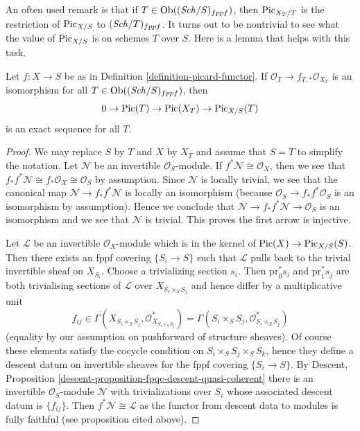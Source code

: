 \noindent
An often used remark is that if $T \in \mathop{\mathrm{Ob}}\nolimits((\mathit{Sch}/S)_{fppf})$, then
$\mathrm{Pic}_{X_T/T}$ is the restriction of $\mathrm{Pic}_{X/S}$ to
$(\mathit{Sch}/T)_{fppf}$.
It turns out to be nontrivial to see what the value of $\mathrm{Pic}_{X/S}$
is on schemes $T$ over $S$. Here is a lemma that helps with this
task.

\begin{lemma}
\label{lemma-flat-geometrically-connected-fibres}
Let $f : X \to S$ be as in Definition \ref{definition-picard-functor}.
If $\mathcal{O}_T \to f_{T, *}\mathcal{O}_{X_T}$ is an isomorphism
for all $T \in \mathop{\mathrm{Ob}}\nolimits((\mathit{Sch}/S)_{fppf})$, then
$$
0 \to \mathop{\mathrm{Pic}}\nolimits(T) \to \mathop{\mathrm{Pic}}\nolimits(X_T) \to \mathrm{Pic}_{X/S}(T)
$$
is an exact sequence for all $T$.
\end{lemma}

\begin{proof}
We may replace $S$ by $T$ and $X$ by $X_T$ and assume that $S = T$
to simplify the notation. Let $\mathcal{N}$ be an invertible
$\mathcal{O}_S$-module. If $f^*\mathcal{N} \cong \mathcal{O}_X$, then
we see that $f_*f^*\mathcal{N} \cong f_*\mathcal{O}_X \cong \mathcal{O}_S$
by assumption. Since $\mathcal{N}$ is locally trivial, we see that
the canonical map $\mathcal{N} \to f_*f^*\mathcal{N}$ is locally
an isomorphism (because $\mathcal{O}_S \to f_*f^*\mathcal{O}_S$
is an isomorphism by assumption). Hence we conclude that
$\mathcal{N} \to f_*f^*\mathcal{N} \to \mathcal{O}_S$ is an isomorphism
and we see that $\mathcal{N}$ is trivial. This proves the first arrow
is injective.

\medskip\noindent
Let $\mathcal{L}$ be an invertible $\mathcal{O}_X$-module which is in
the kernel of $\mathop{\mathrm{Pic}}\nolimits(X) \to \mathrm{Pic}_{X/S}(S)$. Then there exists
an fppf covering $\{S_i \to S\}$ such that $\mathcal{L}$ pulls back
to the trivial invertible sheaf on $X_{S_i}$. Choose a trivializing
section $s_i$. Then $\text{pr}_0^*s_i$ and $\text{pr}_1^*s_j$ are both
trivialising sections of $\mathcal{L}$ over $X_{S_i \times_S S_j}$
and hence differ by a multiplicative unit
$$
f_{ij} \in
\Gamma(X_{S_i \times_S S_j}, \mathcal{O}_{X_{S_i \times_S S_j}}^*) =
\Gamma(S_i \times_S S_j, \mathcal{O}_{S_i \times_S S_j}^*)
$$
(equality by our assumption on pushforward of structure sheaves).
Of course these elements satisfy the cocycle condition on
$S_i \times_S S_j \times_S S_k$, hence they define a descent datum
on invertible sheaves for the fppf covering $\{S_i \to S\}$.
By Descent, Proposition \ref{descent-proposition-fpqc-descent-quasi-coherent}
there is an invertible $\mathcal{O}_S$-module $\mathcal{N}$
with trivializations over $S_i$ whose associated descent datum is
$\{f_{ij}\}$. Then $f^*\mathcal{N} \cong \mathcal{L}$ as the
functor from descent data to modules is fully faithful (see proposition
cited above).
\end{proof}

